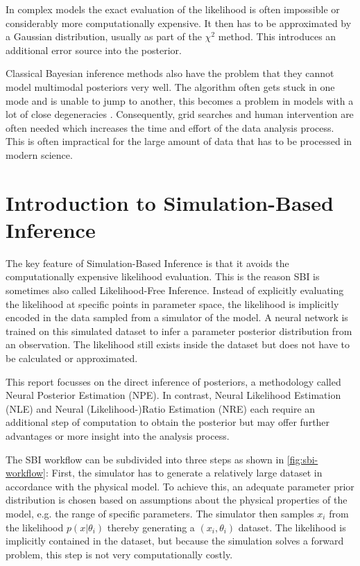 In complex models the exact evaluation of the likelihood is often impossible or considerably more computationally expensive.
It then has to be approximated by a Gaussian distribution, usually as part of the $\chi^2$ method.
This introduces an additional error source into the posterior.

Classical Bayesian inference methods also have the problem that they cannot model multimodal posteriors very well.
The algorithm often gets stuck in one mode and is unable to jump to another, this becomes a problem in models with a lot of close degeneracies \citep[Sec.\,1,\,2.1]{sbi-guide}.
Consequently, grid searches and human intervention are often needed which increases the time and effort of the data analysis process.
This is often impractical for the large amount of data that has to be processed in modern science.


\section{Introduction to Simulation-Based Inference}%
\label{sec:sbi}

The key feature of Simulation-Based Inference is that it avoids the computationally expensive likelihood evaluation.
This is the reason SBI is sometimes also called Likelihood-Free Inference.
Instead of explicitly evaluating the likelihood at specific points in parameter space, the likelihood is implicitly encoded in the data sampled from a simulator of the model.
A neural network is trained on this simulated dataset to infer a parameter posterior distribution from an observation.
The likelihood still exists inside the dataset but does not have to be calculated or approximated.

This report focusses on the direct inference of posteriors, a methodology called Neural Posterior Estimation (NPE).
In contrast, Neural Likelihood Estimation (NLE) and Neural (Likelihood-)Ratio Estimation (NRE) each require an additional step of computation to obtain the posterior but may offer further advantages or more insight into the analysis process.

The SBI workflow can be subdivided into three steps as shown in \cref{fig:sbi-workflow}:
First, the simulator has to generate a relatively large dataset in accordance with the physical model.
To achieve this, an adequate parameter prior distribution is chosen based on assumptions about the physical properties of the model, e.g. the range of specific parameters.
The simulator then samples $x_i$ from the likelihood $p(x|\theta_i)$ thereby generating a $(x_i,\theta_i)$ dataset.
The likelihood is implicitly contained in the dataset, but because the simulation solves a forward problem, this step is not very computationally costly.


